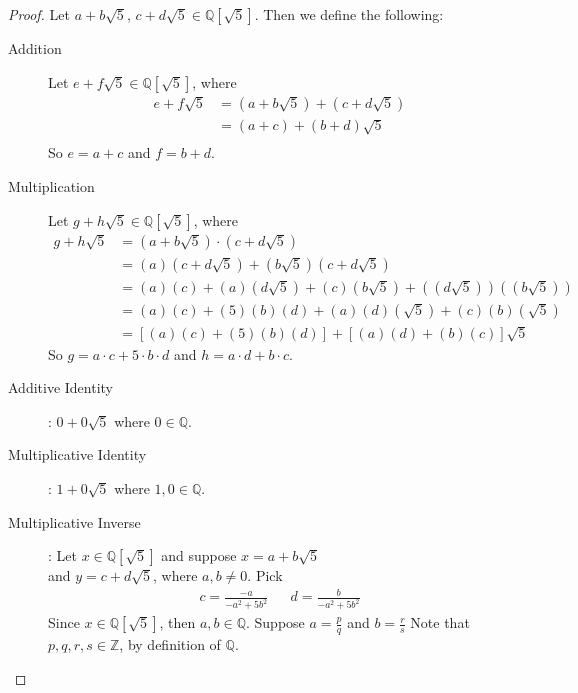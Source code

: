 \documentclass{article}
\begin{document}
  \begin{proof}
    Let $a+b\sqrt{5}$, $c+d\sqrt{5} \in \mathbb{Q}[\sqrt{5}]$. Then we define the following: \\
    \begin{description}
        \item[Addition] Let $e+f\sqrt{5} \in \mathbb{Q}[\sqrt{5}]$, where
        \begin{align*}
                  e+f\sqrt{5} & = (a+b\sqrt{5}) + (c+d\sqrt{5}) \\
                              & = (a+c) + (b+d)\sqrt{5}\\
        \end{align*}
        So $ e = a+c$ and $f = b+d$.
        \item[Multiplication] Let $g+h\sqrt{5} \in \mathbb{Q}[\sqrt{5}]$, where
        \begin{align*}
                  g+h\sqrt{5} & = (a+b\sqrt{5}) \cdot (c+d\sqrt{5}) \\
                              & = (a)(c+d\sqrt{5}) + (b\sqrt{5})(c+d\sqrt{5})\\
                              & = (a)(c) + (a)(d\sqrt{5}) + (c)(b\sqrt{5}) 
                                         + ((d\sqrt{5}))((b\sqrt{5})) \\
                              & = (a)(c) + (5)(b)(d) + (a)(d)(\sqrt{5}) + (c)(b)(\sqrt{5}) \\
                              & = [(a)(c) + (5)(b)(d)] + [(a)(d) + (b)(c)]\sqrt{5}
        \end{align*}
        So $g = a \cdot c + 5 \cdot b \cdot d$ and $h = a \cdot d + b \cdot c$.
        
        \item[Additive Identity]: $0 + 0\sqrt{5}$ where $ 0 \in \mathbb{Q}$.
        \item[Multiplicative Identity]: $1 + 0\sqrt{5}$ where $ 1,0 \in \mathbb{Q}$.
        
    \break
        \item[Multiplicative Inverse]: Let $x \in \mathbb{Q}[\sqrt{5}]$ and suppose
          $x = a+b\sqrt{5}$ \\
          and  $y = c+d\sqrt{5}$, where $a,b \neq 0$. Pick
          \begin{align*}
            c = \frac{-a}{-a^2+5b^2} & & d = \frac{b}{-a^2+5b^2}
          \end{align*}
          Since $x \in \mathbb{Q}[\sqrt{5}]$, then $a,b \in \mathbb{Q}$. Suppose
          $a=\frac{p}{q}$ and $b=\frac{r}{s}$
          Note that $p,q,r,s \in \mathbb{Z}$, by definition of $\mathbb{Q}$. \\
          

\end{description}
\end{proof}
\end{document}
